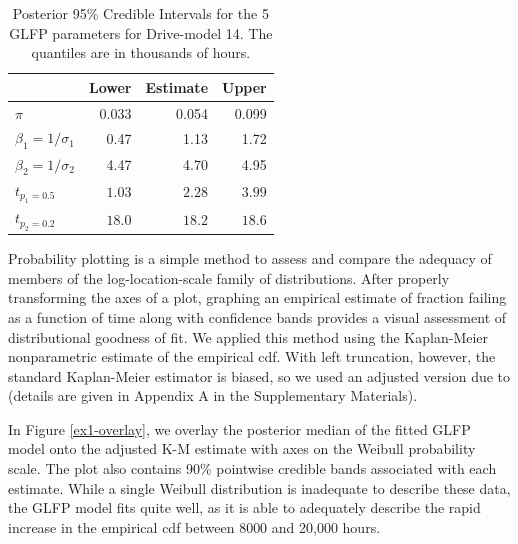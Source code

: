 \documentclass[11pt]{article}
\begin{document}
\begin{table}[H]
\centering
\begin{tabular}{lrrr}
  \hline
 & Lower & Estimate & Upper \\ 
  \hline
$\pi$ & 0.033 & 0.054 & 0.099 \\ 
 $\beta_1 = 1/\sigma_1 $ & 0.47 & 1.13 & 1.72 \\ 
  $\beta_2 = 1/\sigma_2$ & 4.47 & 4.70 & 4.95 \\ 
  $t_{p_1=0.5}$ & $1.03$  & $2.28$ & $3.99$\\ 
  $t_{p_2=0.2}$ & $18.0$ & $18.2$ & $18.6$ \\ 
   \hline
\end{tabular}
\caption{\footnotesize Posterior 95\% Credible Intervals for the 5 GLFP parameters for Drive-model 14.  The quantiles are in thousands of hours.}
\label{table:1}
\end{table}


Probability plotting is a simple method to assess and compare the adequacy of members of the log-location-scale family of distributions.  After properly transforming the axes of a plot, graphing an empirical estimate of fraction failing as a function of time along with confidence bands provides a visual assessment of distributional goodness of fit.  We applied this method using the Kaplan-Meier nonparametric estimate of the empirical cdf.  With left truncation, however, the standard Kaplan-Meier estimator is biased, so we used an adjusted version due to \citet[Chapter 11]{meeker} (details are given in Appendix A in the Supplementary Materials).   


In Figure \ref{ex1-overlay}, we overlay the posterior median of the fitted GLFP model onto the adjusted K-M estimate with axes on the Weibull probability scale.  The plot also contains 90\% pointwise credible bands associated with each estimate. While a single Weibull distribution is inadequate to describe these data, the GLFP model fits quite well, as it is able to adequately describe the rapid increase in the empirical cdf between 8000 and 20,000 hours. %
\end{document}
